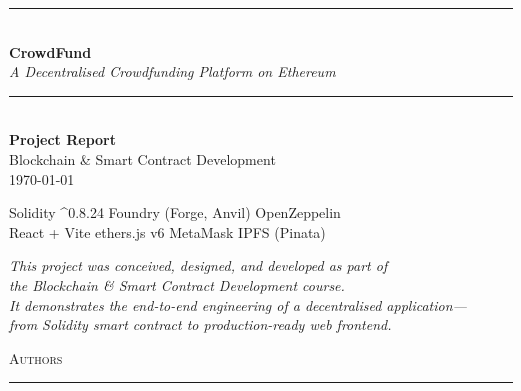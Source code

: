 \documentclass[12pt, a4paper]{article}
\begin{document}
\begin{titlepage}
\centering

\vspace*{3cm}

{\color{ethblue}\rule{\textwidth}{2pt}}\\[1.5cm]

{\fontsize{42}{50}\selectfont\bfseries\color{ethblue} CrowdFund}\\[0.8cm]

{\LARGE\itshape A Decentralised Crowdfunding Platform on Ethereum}\\[1.5cm]

{\color{ethblue}\rule{\textwidth}{2pt}}\\[2.5cm]

{\Large\textbf{Project Report}}\\[0.4cm]
{\large Blockchain \& Smart Contract Development}\\[0.3cm]
{\large\today}

\vfill

\begin{minipage}{0.8\textwidth}
\centering
{\small\color{gray} Solidity \textasciicircum{}0.8.24 \;\textbullet\; Foundry (Forge, Anvil) \;\textbullet\; OpenZeppelin\\[0.2cm]
React + Vite \;\textbullet\; ethers.js v6 \;\textbullet\; MetaMask \;\textbullet\; IPFS (Pinata)}
\end{minipage}

\vspace{1cm}

\end{titlepage}

\thispagestyle{empty}
\vspace*{3cm}

\begin{center}
{\large\itshape This project was conceived, designed, and developed as part of\\[0.2cm]
the Blockchain \& Smart Contract Development course.\\[0.3cm]
It demonstrates the end-to-end engineering of a decentralised application---\\[0.2cm]
from Solidity smart contract to production-ready web frontend.}
\end{center}

\vspace{2.5cm}

\begin{center}
{\Large\scshape Authors}\\[0.3cm]
{\color{ethblue}\rule{0.3\textwidth}{0.5pt}}
\end{center}
\end{document}
